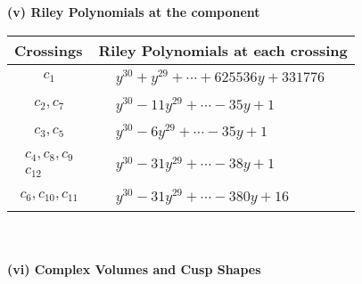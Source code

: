 \documentclass[1p]{elsarticle_modified}
\theoremstyle{definition}
\begin{document}
\newpage\renewcommand{\arraystretch}{1}
\flushleft \textbf{(v) Riley Polynomials at the component}\newline \\
\begin{tabular}{m{50pt}|m{274pt}}
Crossings & \hspace{64pt}Riley Polynomials at each crossing \\
\hline $$\begin{aligned}c_{1}\end{aligned}$$&$\begin{aligned}
&y^{30}+y^{29}+\cdots+625536 y+331776
\end{aligned}$\\
\hline $$\begin{aligned}c_{2},c_{7}\end{aligned}$$&$\begin{aligned}
&y^{30}-11 y^{29}+\cdots-35 y+1
\end{aligned}$\\
\hline $$\begin{aligned}c_{3},c_{5}\end{aligned}$$&$\begin{aligned}
&y^{30}-6 y^{29}+\cdots-35 y+1
\end{aligned}$\\
\hline $$\begin{aligned}c_{4},c_{8},c_{9}\\c_{12}\end{aligned}$$&$\begin{aligned}
&y^{30}-31 y^{29}+\cdots-38 y+1
\end{aligned}$\\
\hline $$\begin{aligned}c_{6},c_{10},c_{11}\end{aligned}$$&$\begin{aligned}
&y^{30}-31 y^{29}+\cdots-380 y+16
\end{aligned}$\\
\hline
\end{tabular}\\~\\
\newpage\flushleft \textbf{(vi) Complex Volumes and Cusp Shapes}
\end{document}
